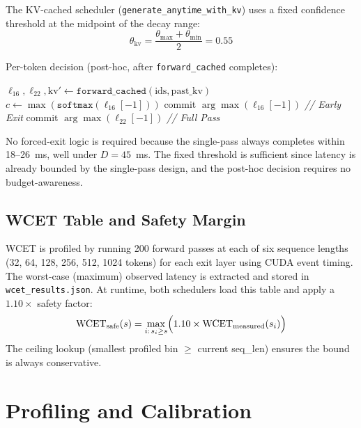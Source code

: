 \documentclass[conference]{IEEEtran}
\begin{document}
The KV-cached scheduler (\texttt{generate\_anytime\_with\_kv}) uses a fixed confidence threshold at the midpoint of the decay range:
\begin{equation}
\theta_{\text{kv}} = \frac{\theta_{\max} + \theta_{\min}}{2} = 0.55
\label{eq:kv_thresh}
\end{equation}

Per-token decision (post-hoc, after \texttt{forward\_cached} completes):
\begin{algorithmic}[1]
\STATE $\ell_{16}, \ell_{22}, \text{kv}' \leftarrow \texttt{forward\_cached}(\text{ids}, \text{past\_kv})$
\STATE $c \leftarrow \max(\texttt{softmax}(\ell_{16}[-1]))$
    \STATE commit $\arg\max(\ell_{16}[-1])$ \quad\textit{// Early Exit}
\ELSE
    \STATE commit $\arg\max(\ell_{22}[-1])$ \quad\textit{// Full Pass}
\ENDIF
\end{algorithmic}

No forced-exit logic is required because the single-pass always completes within 18--26~ms, well under $D = 45$~ms. The fixed threshold is sufficient since latency is already bounded by the single-pass design, and the post-hoc decision requires no budget-awareness.

\subsection{WCET Table and Safety Margin}

WCET is profiled by running 200 forward passes at each of six sequence lengths (32, 64, 128, 256, 512, 1024 tokens) for each exit layer using CUDA event timing. The worst-case (maximum) observed latency is extracted and stored in \texttt{wcet\_results.json}. At runtime, both schedulers load this table and apply a $1.10\times$ safety factor:
\begin{equation}
\text{WCET}_{\text{safe}}(s) = \max_{i:\, s_i \geq s} \Bigl( 1.10 \times \text{WCET}_{\text{measured}}(s_i) \Bigr)
\label{eq:wcet_safe}
\end{equation}
The ceiling lookup (smallest profiled bin $\geq$ current seq\_len) ensures the bound is always conservative.

\section{Profiling and Calibration}
\end{document}
